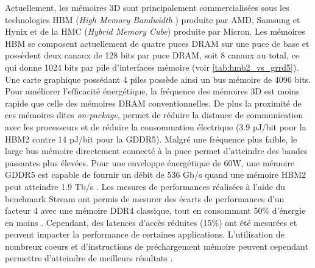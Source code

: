         
        Actuellement, les mémoires 3D sont principalement commercialisées sous les technologies HBM (\textit{High Memory Bandwidth} \cite{Standard2013}) produite par AMD, Samsung et Hynix et de la HMC (\textit{Hybrid Memory Cube}\cite{Jeddeloh2012}) produite par Micron. Les mémoires HBM se composent actuellement de quatre puces DRAM sur une puce de base et possèdent deux canaux de 128 bits par puce DRAM, soit 8 canaux au total, ce qui donne 1024 bits par pile d'interfaces mémoire (voir \autoref{tab:hmb2_vs_grrd5}). Une carte graphique possédant 4 piles possède ainsi un bus mémoire de 4096 bits. Pour améliorer l'efficacité énergétique, la fréquence des mémoires 3D est moins rapide que celle des mémoires DRAM conventionnelles. De plus la proximité de ces mémoires dites \textit{on-package}, permet de réduire la distance de communication avec les processeurs et de réduire la consommation électrique (3.9 pJ/bit pour la HBM2 contre 14 pJ/bit pour la GDDR5). Malgré une fréquence plus faible, le large bus mémoire directement connecté à la puce permet d'atteindre des bandes passantes plus élevées. Pour une enveloppe énergétique de 60W, une mémoire GDDR5 est capable de fournir un débit de 536 Gb/s quand une mémoire HBM2 peut atteindre 1.9 Tb/s \cite{OConnor2017}. Les mesures de performances réalisées à l'aide du benchmark Stream ont permis de mesurer des écarts de performances d'un facteur 4 avec une mémoire DDR4 classique\cite{7965110}, tout en consommant 50\% d'énergie en moins . Cependant, des latences d'accès réduites (15\%) ont été mesurées et peuvent impacter la performance de certaines applications. L'utilisation de nombreux coeurs et d'instructions de préchargement mémoire peuvent cependant permettre d'atteindre de meilleurs résultats \cite{7965110}.
        
        \begin{table}[]
        \centering
        \caption{Comparaison des mémoires GDDR5 utilisées sur les GPU NVidia K80 et des mémoires HBM2 utilisées sur un GPU utilisant 4 piles de mémoire.}
        \label{tab:hmb2_vs_grrd5}
        \end{table}
         
